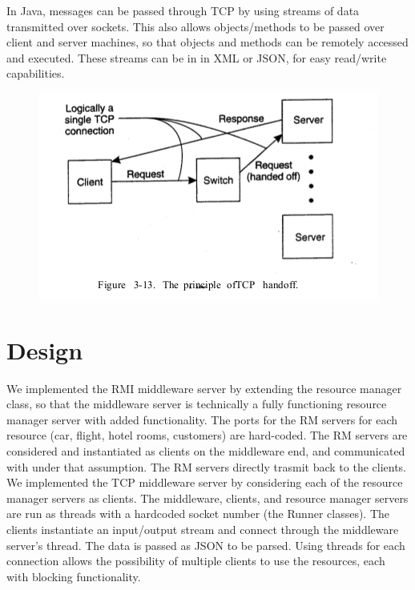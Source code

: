\documentclass[letterpaper,12pt]{article}
\begin{document}
In Java, messages can be passed through TCP by using streams of data transmitted over sockets. This also allows objects/methods to be passed over client and server machines, so that objects and methods can be remotely accessed and executed. These streams can be in in XML or JSON, for easy read/write capabilities.

\begin{figure}[ht] 
	\centering \includegraphics[width=0.8\columnwidth]{figure2.png}
	
\end{figure} 

\section{Design}

We implemented the RMI middleware server by extending the resource manager class, so that the middleware server is technically a fully functioning resource manager server with added functionality. The ports for the RM servers for each resource (car, flight, hotel rooms, customers) are hard-coded. The RM servers are considered and instantiated as clients on the middleware end, and communicated with under that assumption. The RM servers directly trasmit back to the clients. \\

We implemented the TCP middleware server by considering each of the resource manager servers as clients. The middleware, clients, and resource manager servers are run as threads with a hardcoded socket number (the Runner classes). The clients instantiate an input/output stream and connect through the middleware server's thread. The data is passed as JSON to be parsed. Using threads for each connection allows the possibility of multiple clients to use the resources, each with blocking functionality. \\
\end{document}
